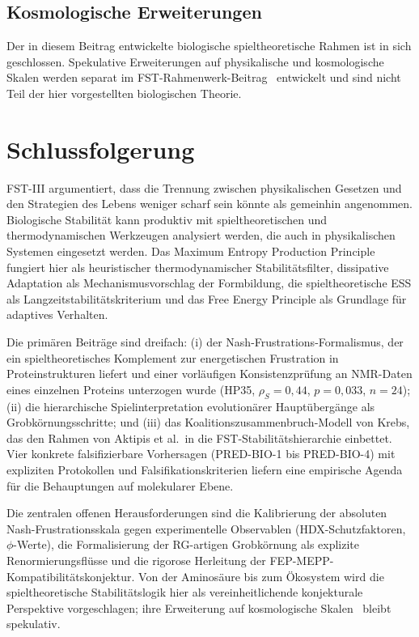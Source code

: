 \documentclass[12pt,a4paper]{article}
\theoremstyle{remark}
\begin{document}
\subsection{Kosmologische Erweiterungen}
\label{sec:cosmology}

Der in diesem Beitrag entwickelte biologische spieltheoretische Rahmen ist in sich geschlossen. Spekulative Erweiterungen auf physikalische und kosmologische Skalen werden separat im FST-Rahmenwerk-Beitrag~\citep{FST-Unified2026} entwickelt und sind nicht Teil der hier vorgestellten biologischen Theorie.


\section{Schlussfolgerung}
\label{sec:conclusion}

FST-III argumentiert, dass die Trennung zwischen physikalischen Gesetzen und den Strategien des Lebens weniger scharf sein könnte als gemeinhin angenommen. Biologische Stabilität kann produktiv mit spieltheoretischen und thermodynamischen Werkzeugen analysiert werden, die auch in physikalischen Systemen eingesetzt werden. Das Maximum Entropy Production Principle fungiert hier als heuristischer thermodynamischer Stabilitätsfilter, dissipative Adaptation als Mechanismusvorschlag der Formbildung, die spieltheoretische ESS als Langzeitstabilitätskriterium und das Free Energy Principle als Grundlage für adaptives Verhalten.

Die primären Beiträge sind dreifach: (i) der Nash-Frustrations-Formalismus, der ein spieltheoretisches Komplement zur energetischen Frustration in Proteinstrukturen liefert und einer vorläufigen Konsistenzprüfung an NMR-Daten eines einzelnen Proteins unterzogen wurde (HP35, $\rho_S = 0{,}44$, $p = 0{,}033$, $n = 24$); (ii) die hierarchische Spielinterpretation evolutionärer Hauptübergänge als Grobkörnungsschritte; und (iii) das Koalitionszusammenbruch-Modell von Krebs, das den Rahmen von Aktipis et al.\ in die FST-Stabilitätshierarchie einbettet. Vier konkrete falsifizierbare Vorhersagen (PRED-BIO-1 bis PRED-BIO-4) mit expliziten Protokollen und Falsifikationskriterien liefern eine empirische Agenda für die Behauptungen auf molekularer Ebene.

Die zentralen offenen Herausforderungen sind die Kalibrierung der absoluten Nash-Frustrationsskala gegen experimentelle Observablen (HDX-Schutzfaktoren, $\phi$-Werte), die Formalisierung der RG-artigen Grobkörnung als explizite Renormierungsflüsse und die rigorose Herleitung der FEP-MEPP-Kompatibilitätskonjektur. Von der Aminosäure bis zum Ökosystem wird die spieltheoretische Stabilitätslogik hier als vereinheitlichende konjekturale Perspektive vorgeschlagen; ihre Erweiterung auf kosmologische Skalen~\citep{FST-Unified2026} bleibt spekulativ.
\end{document}
